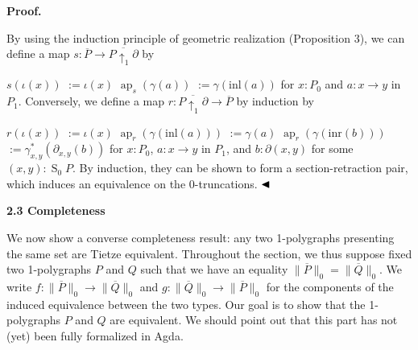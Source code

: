 \documentclass[10pt,a4paper]{amsart}
\begin{document}
 
 
 
 
\par\medskip\noindent\textbf{Proof.}\par
 
 
By using the induction principle of geometric realization (Proposition 3), we can define a map $s:\overline{P}\to\overline{P{\uparrow_{1}}\partial}$ by\par
    $\displaystyle s(\iota(x))$ $\displaystyle:=\iota(x)$ $\displaystyle\operatorname{ap}_{s}(\gamma(a))$ $\displaystyle:=\gamma(\mathrm{inl}(a))$    
for $x:P_{0}$ and $a:x\to y$ in $P_{1}$. Conversely, we define a map $r:\overline{P{\uparrow_{1}}\partial}\to\overline{P}$ by induction by\par
    $\displaystyle r(\iota(x))$ $\displaystyle:=\iota(x)$ $\displaystyle\operatorname{ap}_{r}(\gamma(\mathrm{inl}(a)))$ $\displaystyle:=\gamma(a)$ $\displaystyle\operatorname{ap}_{r}(\gamma(\mathrm{inr}(b)))$ $\displaystyle:=\gamma^{*}_{x,y}(\partial_{x,y}(b))$    
for $x:P_{0}$, $a:x\to y$ in $P_{1}$, and $b:\partial(x,y)$ for some $(x,y):\operatorname{S}_{0}P$. By induction, they can be shown to form a section-retraction pair, which induces an equivalence on the 0-truncations. $\hfill\blacktriangleleft$\par
 
 

 
\par\medskip\noindent\textbf{2.3 Completeness}\par
 
 
We now show a converse completeness result: any two 1-polygraphs presenting the same set are Tietze equivalent. Throughout the section, we thus suppose fixed two 1-polygraphs $P$ and $Q$ such that we have an equality $\|\overline{P}\|_{0}=\|\overline{Q}\|_{0}$. We write $f:\|\overline{P}\|_{0}\to\|\overline{Q}\|_{0}$ and $g:\|\overline{Q}\|_{0}\to\|\overline{P}\|_{0}$ for the components of the induced equivalence between the two types. Our goal is to show that the 1-polygraphs $P$ and $Q$ are equivalent. We should point out that this part has not (yet) been fully formalized in Agda.\par
 
\end{document}

